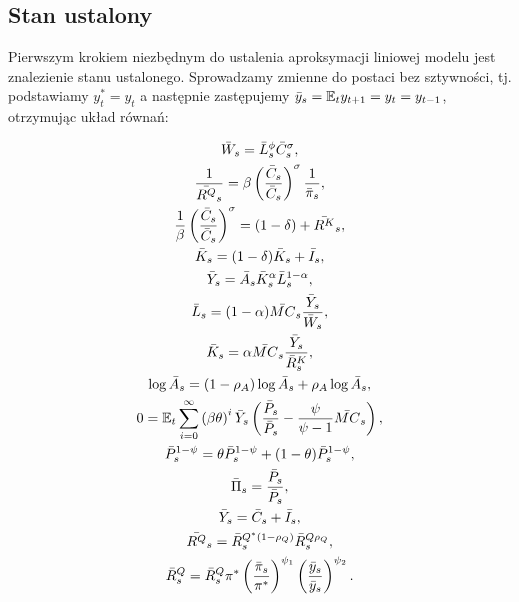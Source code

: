 \subsection{Stan ustalony}
\label{sec:results:steady_state_model}

Pierwszym krokiem niezbędnym do ustalenia aproksymacji liniowej modelu jest znalezienie stanu ustalonego. Sprowadzamy zmienne do postaci bez sztywności, tj. podstawiamy $y^*_{t} = y_{t}$ a następnie zastępujemy $\bar{y}_s = \mathbb{E}_t y_{t+1} = y_t = y_{t-1}$, otrzymując układ równań:

\begin{gather}
    \label{eq:mc_consumption_solve}
    \bar{W}_s = \bar{L}_s^{\phi} \bar{C}_s^{\sigma}, \\
    \label{eq:steady_monetary_solve}
    \frac{1}{\bar{R^Q}_s} = \beta  \left(\frac{\bar{C}_s}{\bar{C}_s}\right)^\sigma \frac{1}{\bar{\pi}_s}, \\
    \label{eq:steady_r_solve}
    \frac{1}{\beta}\left(\frac{\bar{C}_s}{\bar{C}_s}\right)^\sigma = (1-\delta) + \bar{R^K}_s, \\
    \label{eq:capital_movement_steady_solve}
    \bar{K}_s = (1-\delta)\bar{K}_s + \bar{I}_s,\\
    \label{eq:mc_production_solve}
    \bar{Y}_s = \bar{A}_s \bar{K}_s^\alpha \bar{L}_s^{1-\alpha}, \\
    \label{eq:mc_worktime_solve}
    \bar{L}_s = (1-\alpha) \bar{MC}_s \frac{\bar{Y}_s}{\bar{W}_s},\\
    \label{eq:mc_invest_solve}
    \bar{K}_s = \alpha \bar{MC}_s \frac{\bar{Y}_s}{\bar{R}_s^K},\\
    \log{\bar{A}_s} = (1-\rho_A)\log{\bar{A}_s} + \rho_A \log{\bar{A}_s},\\
    \label{eq:mc_steady_solve}
    0 = \mathbb{E}_t \sum_{i=0}^{\infty}\left( \beta \theta \right)^i \bar{Y}_s \left( \frac{\bar{P}_s}{\bar{P}_s} - \frac{\psi}{\psi - 1} \bar{MC}_s \right), \\
    \bar{P}_s^{1-\psi} = \theta \bar{P}_s^{1-\psi} + (1-\theta) \bar{P}_s^{1-\psi}, \\
    \bar{\Pi}_s = \frac{\bar{P}_s}{\bar{P}_s},\\
    \bar{Y}_s = \bar{C}_s + \bar{I}_s, \\
    \bar{R^Q}_s = \bar{R}_s^{Q^*(1-\rho_Q)}\bar{R}_s^{Q\rho_Q}, \\
    \bar{R}_s^{Q} = \bar{R}_s^Q \pi^* \left( \frac{\bar{\pi}_s}{\pi^*}\right)^{\psi_1} \left(\frac{\bar{y}_s}{\bar{y}_s}\right)^{\psi_2}.
\end{gather}

